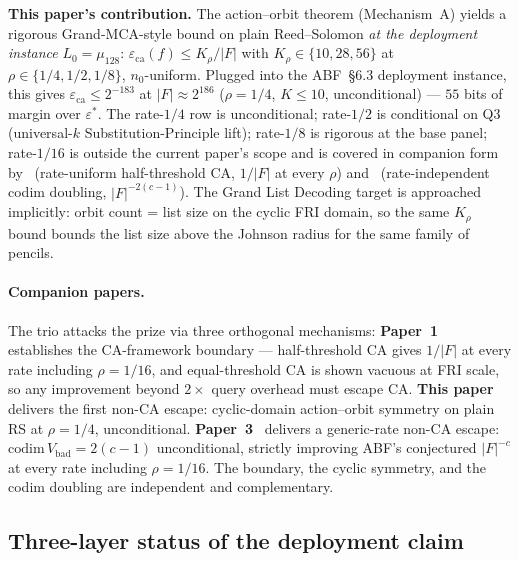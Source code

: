 \documentclass[11pt]{article}
\theoremstyle{definition}
\theoremstyle{remark}
\begin{document}
\smallskip\noindent
\textbf{This paper's contribution.} The action--orbit theorem
(Mechanism~A) yields a rigorous Grand-MCA-style bound on plain
Reed--Solomon \emph{at the deployment instance} $L_0 = \mu_{128}$:
$\varepsilon_{\mathrm{ca}}(f) \leq K_\rho / |F|$ with $K_\rho \in
\{10, 28, 56\}$ at $\rho \in \{1/4, 1/2, 1/8\}$, $n_0$-uniform.
Plugged into the ABF~\S 6.3 deployment instance, this gives
$\varepsilon_{\mathrm{ca}} \leq 2^{-183}$ at $|F| \approx 2^{186}$
($\rho = 1/4$, $K \leq 10$, unconditional) ---
$55$ bits of margin over $\varepsilon^*$. The rate-$1/4$ row is
unconditional; rate-$1/2$ is conditional on Q3 (universal-$k$
Substitution-Principle lift); rate-$1/8$ is rigorous at the base
panel; rate-$1/16$ is outside the current paper's scope and is
covered in companion form by~\cite{Paper1} (rate-uniform
half-threshold CA, $1/|F|$ at every $\rho$) and~\cite{Paper3Companion}
(rate-independent codim doubling, $|F|^{-2(c-1)}$). The Grand List
Decoding target is approached implicitly: orbit count = list size on
the cyclic FRI domain, so the same $K_\rho$ bound bounds the list size
above the Johnson radius for the same family of pencils.

\paragraph{Companion papers.} The trio attacks the prize via three
orthogonal mechanisms:
\textbf{Paper~1}~\cite{Paper1} establishes the CA-framework
boundary --- half-threshold CA gives $1/|F|$ at every rate
including $\rho = 1/16$, and equal-threshold CA is shown vacuous
at FRI scale, so any improvement beyond $2{\times}$ query overhead
must escape CA.
\textbf{This paper} delivers the first non-CA escape: cyclic-domain
action--orbit symmetry on plain RS at $\rho = 1/4$, unconditional.
\textbf{Paper~3}~\cite{Paper3Companion} delivers a generic-rate non-CA
escape: $\mathrm{codim}\, V_{\mathrm{bad}} = 2(c-1)$
unconditional, strictly improving ABF's conjectured $|F|^{-c}$ at
every rate including $\rho = 1/16$. The boundary, the cyclic
symmetry, and the codim doubling are independent and complementary.

\subsection{Three-layer status of the deployment claim}
\label{ssec:abf-row-table}
\end{document}
